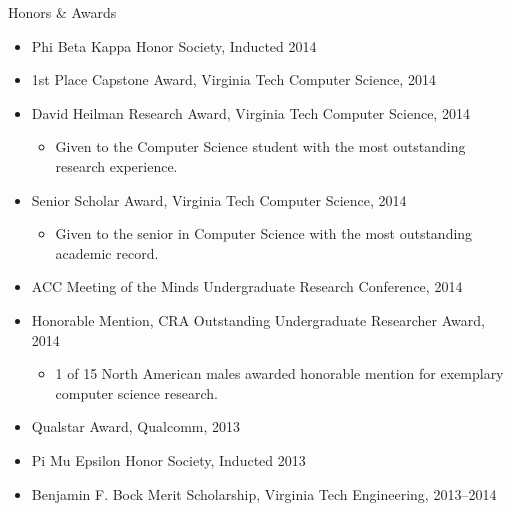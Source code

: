\documentclass[letter]{article}
\begin{document}
\begin{minipage}{\textwidth}
{\huge Honors \& Awards }


  \begin{itemize}
    
      \item Phi Beta Kappa Honor Society, Inducted 2014
      
    
      \item 1st Place Capstone Award, Virginia Tech Computer Science, 2014
      
    
      \item David Heilman Research Award, Virginia Tech Computer Science, 2014
      
        \begin{itemize}
          \item Given to the Computer Science student with the most outstanding research experience.
        \end{itemize}
      
    
      \item Senior Scholar Award, Virginia Tech Computer Science, 2014
      
        \begin{itemize}
          \item Given to the senior in Computer Science with the most outstanding academic record.
        \end{itemize}
      
    
      \item ACC Meeting of the Minds Undergraduate Research Conference, 2014
      
    
      \item Honorable Mention, CRA Outstanding Undergraduate Researcher Award, 2014
      
        \begin{itemize}
          \item 1 of 15 North American males awarded honorable mention for exemplary computer science research.
        \end{itemize}
      
    
      \item Qualstar Award, Qualcomm, 2013
      
    
      \item Pi Mu Epsilon Honor Society, Inducted 2013
      
    
      \item Benjamin F. Bock Merit Scholarship, Virginia Tech Engineering, 2013--2014
      

\end{itemize}
\end{minipage}
\end{document}
